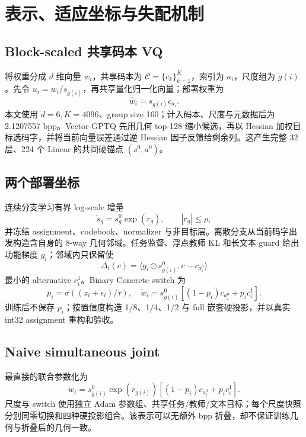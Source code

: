 \section{表示、适应坐标与失配机制}
\subsection{Block-scaled 共享码本 VQ}
将权重分成 $d$ 维向量 $w_i$，共享码本为 $\mathcal C=\{c_k\}_{k=1}^K$，索引为 $a_i$，尺度组为 $g(i)$。先令 $u_i=w_i/s_{g(i)}$，再共享量化归一化向量；部署权重为
\begin{equation}
\hat w_i=s_{g(i)}c_{a_i}.
\end{equation}
本文使用 $d=6,K=4096$、group size 160；计入码本、尺度与元数据后为 2.1207557 bpp。Vector-GPTQ 先用几何 top-128 缩小候选，再以 Hessian 加权目标选码字，并将当前向量误差通过逆 Hessian 因子反馈给剩余列。这产生完整 32 层、224 个 Linear 的共同硬锚点 $(s^0,a^0)$。

\subsection{两个部署坐标}
连续分支学习有界 log-scale 增量
\begin{equation}
\tilde s_g=s_g^0\exp(r_g),\qquad |r_g|\le\rho,
\end{equation}
并冻结 assignment、codebook、normalizer 与非目标层。离散分支从当前码字出发构造含自身的 8-way 几何邻域。任务监督、浮点教师 KL 和长文本 guard 给出功能梯度 $g_i$；邻域内只保留使
\begin{equation}
\Delta_i(c)=\langle g_i\odot s^0_{g(i)},c-c_{a_i^0}\rangle
\end{equation}
最小的 alternative $c_i^1$。Binary Concrete switch 为
\begin{equation}
p_i=\sigma((z_i+\epsilon_i)/\tau),\quad
\tilde w_i=s^0_{g(i)}[(1-p_i)c_{a_i^0}+p_ic_i^1].
\end{equation}
训练后不保存 $p_i$；按置信度构造 1/8、1/4、1/2 与 full 嵌套硬投影，并以真实 int32 assignment 重构和验收。

\subsection{Naive simultaneous joint}
最直接的联合参数化为
\begin{equation}
\tilde w_i=s^0_{g(i)}\exp(r_{g(i)})[(1-p_i)c_{a_i^0}+p_ic_i^1].
\end{equation}
尺度与 switch 使用独立 Adam 参数组、共享任务/教师/文本目标；每个尺度快照分别同零切换和四种硬投影组合。该表示可以无额外 bpp 折叠，却不保证训练几何与折叠后的几何一致。


